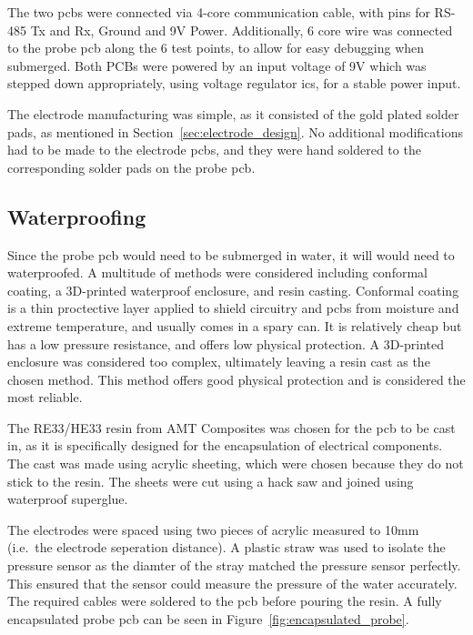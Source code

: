 \hfill \break

The two \gls{pcb}s were connected via 4-core communication cable, with pins for RS-485 Tx and Rx, Ground and 9V Power.
Additionally, 6 core wire was connected to the probe \gls{pcb} along the 6 test points, to allow for easy debugging when submerged.
Both PCBs were powered by an input voltage of 9V which was stepped down appropriately, using voltage regulator \gls{ic}s, for a stable power input.

The electrode manufacturing was simple, as it consisted of the gold plated solder pads, as mentioned in Section~\ref{sec:electrode_design}.
No additional modifications had to be made to the electrode \gls{pcb}s, and they were hand soldered to the corresponding solder pads on the probe \gls{pcb}.

\subsection{Waterproofing}
Since the probe \gls{pcb} would need to be submerged in water, it will would need to waterproofed.
A multitude of methods were considered including conformal coating, a 3D-printed waterproof enclosure, and resin casting.
Conformal coating is a thin proctective layer applied to shield circuitry and \gls{pcb}s from moisture and extreme temperature, and usually comes in a spary can.
It is relatively cheap but has a low pressure resistance, and offers low physical protection.
A 3D-printed enclosure was considered too complex, ultimately leaving a resin cast as the chosen method.
This method offers good physical protection and is considered the most reliable.

The RE33/HE33 resin from AMT Composites was chosen for the \gls{pcb} to be cast in, as it is specifically designed for the encapsulation of electrical components.
The cast was made using acrylic sheeting, which were chosen because they do not stick to the resin.
The sheets were cut using a hack saw and joined using waterproof superglue.

The electrodes were spaced using two pieces of acrylic measured to 10mm (i.e.~the electrode seperation distance).
A plastic straw was used to isolate the pressure sensor as the diamter of the stray matched the pressure sensor perfectly.
This ensured that the sensor could measure the pressure of the water accurately.
The required cables were soldered to the \gls{pcb} before pouring the resin.
A fully encapsulated probe \gls{pcb} can be seen in Figure~\ref{fig:encapsulated_probe}.

